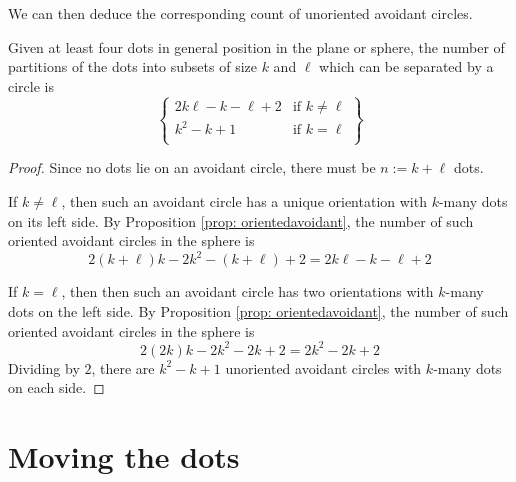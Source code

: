 \documentclass[11pt,oneside]{amsart}
\newenvironment{rethm}[1]
  {\renewcommand\theinnercustomthm{#1}\innercustomthm}
  {\endinnercustomthm}
\theoremstyle{definition}
\theoremstyle{remark}
\numberwithin{equation}{section}
\begin{document}
We can then deduce the corresponding count of unoriented avoidant circles.


\begin{rethm}{\ref{thm: avoidant}}
Given at least four dots in general position in the plane or sphere, the number of partitions of the dots into subsets of size $k$ and $\ell$ which can be separated by a circle is
    \[
    \left\{
    \begin{array}{cc}
    2k \ell - k - \ell + 2 &\text{if $k\neq \ell$} \\
    k^2 - k + 1 &\text{if $k= \ell$} \\
    \end{array}
    \right\}
    \]
\end{rethm}

\begin{proof}
Since no dots lie on an avoidant circle, there must be $n:=k+\ell$ dots. %

If $k\neq \ell$, then such an avoidant circle has a unique orientation with $k$-many dots on its left side. By Proposition \ref{prop: orientedavoidant}, the number of such oriented avoidant circles in the sphere is 
\[
2(k+\ell)k -2k^2 - (k+\ell) + 2
=
2k \ell - k - \ell + 2
\]

If $k=\ell$, then then such an avoidant circle has two orientations with $k$-many dots on the left side. By Proposition \ref{prop: orientedavoidant}, the number of such oriented avoidant circles in the sphere is 
\[
2(2k)k -2k^2 - 2k + 2
= 2k^2 - 2k + 2
\]
Dividing by $2$, there are $k^2 - k + 1$ unoriented avoidant circles with $k$-many dots on each side.
\end{proof}

\section{Moving the dots}

\def\LConf{\operatorname{LConf}}
\def\Conf{\operatorname{Conf}}
\end{document}
